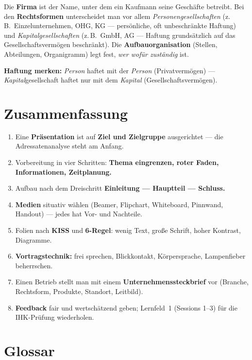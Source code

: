 \documentclass[11pt, a4paper]{article}
\begin{document}
Die \textbf{Firma} ist der Name, unter dem ein Kaufmann seine Geschäfte betreibt. Bei den
\textbf{Rechtsformen} unterscheidet man vor allem \emph{Personengesellschaften} (z.\,B.\
Einzelunternehmen, OHG, KG --- persönliche, oft unbeschränkte Haftung) und
\emph{Kapitalgesellschaften} (z.\,B.\ GmbH, AG --- Haftung grundsätzlich auf das
Gesellschaftsvermögen beschränkt). Die \textbf{Aufbauorganisation} (Stellen, Abteilungen,
Organigramm) legt fest, \emph{wer wofür zuständig} ist.

\begin{eselsbruecke}
\textbf{Haftung merken:} \emph{Person} haftet mit der \emph{Person} (Privatvermögen) ---
\emph{Kapital}gesellschaft haftet nur mit dem \emph{Kapital} (Gesellschaftsvermögen).
\end{eselsbruecke}

\section{Zusammenfassung}

\begin{enumerate}
  \item Eine \textbf{Präsentation} ist auf \textbf{Ziel und Zielgruppe} ausgerichtet --- die Adressatenanalyse steht am Anfang.
  \item Vorbereitung in vier Schritten: \textbf{Thema eingrenzen, roter Faden, Informationen, Zeitplanung.}
  \item Aufbau nach dem Dreischritt \textbf{Einleitung --- Hauptteil --- Schluss.}
  \item \textbf{Medien} situativ wählen (Beamer, Flipchart, Whiteboard, Pinnwand, Handout) --- jedes hat Vor- und Nachteile.
  \item Folien nach \textbf{KISS} und \textbf{6\texttimes6-Regel}: wenig Text, große Schrift, hoher Kontrast, Diagramme.
  \item \textbf{Vortragstechnik:} frei sprechen, Blickkontakt, Körpersprache, Lampenfieber beherrschen.
  \item Einen Betrieb stellt man mit einem \textbf{Unternehmenssteckbrief} vor (Branche, Rechtsform, Produkte, Standort, Leitbild).
  \item \textbf{Feedback} fair und wertschätzend geben; Lernfeld~1 (Sessions 1--3) für die IHK-Prüfung wiederholen.
\end{enumerate}

\newpage

\section*{Glossar}
\end{document}
